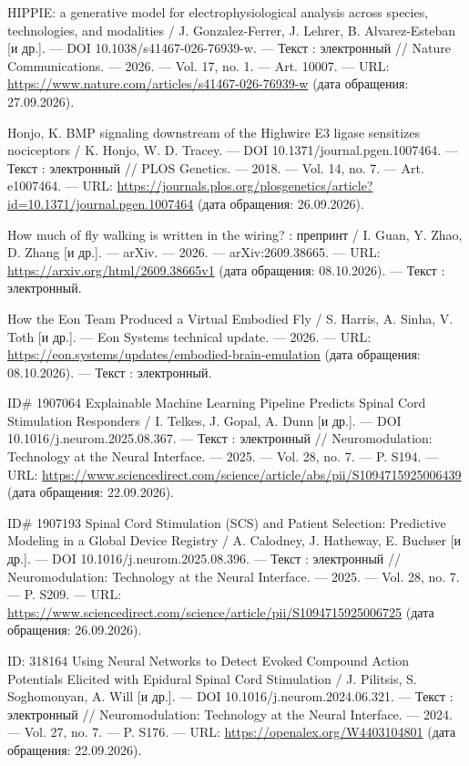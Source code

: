 \begin{list}{}{\setlength{\leftmargin}{10mm}\setlength{\labelwidth}{8mm}\setlength{\labelsep}{2mm}\setlength{\itemsep}{0pt}\setlength{\parsep}{0pt}\setlength{\topsep}{0pt}}
\item[150.] HIPPIE: a generative model for electrophysiological analysis across species, technologies, and modalities / J. Gonzalez-Ferrer, J. Lehrer, B. Alvarez-Esteban [и др.]. — DOI 10.1038/s41467-026-76939-w. — Текст : электронный // Nature Communications. — 2026. — Vol. 17, no. 1. — Art. 10007. — URL: \url{https://www.nature.com/articles/s41467-026-76939-w} (дата обращения: 27.09.2026).
\item[151.] Honjo, K. BMP signaling downstream of the Highwire E3 ligase sensitizes nociceptors / K. Honjo, W. D. Tracey. — DOI 10.1371/journal.pgen.1007464. — Текст : электронный // PLOS Genetics. — 2018. — Vol. 14, no. 7. — Art. e1007464. — URL: \url{https://journals.plos.org/plosgenetics/article?id=10.1371/journal.pgen.1007464} (дата обращения: 26.09.2026).
\item[152.] How much of fly walking is written in the wiring? : препринт / I. Guan, Y. Zhao, D. Zhang [и др.]. — arXiv. — 2026. — arXiv:2609.38665. — URL: \url{https://arxiv.org/html/2609.38665v1} (дата обращения: 08.10.2026). — Текст : электронный.
\item[153.] How the Eon Team Produced a Virtual Embodied Fly / S. Harris, A. Sinha, V. Toth [и др.]. — Eon Systems technical update. — 2026. — URL: \url{https://eon.systems/updates/embodied-brain-emulation} (дата обращения: 08.10.2026). — Текст : электронный.
\item[154.] ID\# 1907064 Explainable Machine Learning Pipeline Predicts Spinal Cord Stimulation Responders / I. Telkes, J. Gopal, A. Dunn [и др.]. — DOI 10.1016/j.neurom.2025.08.367. — Текст : электронный // Neuromodulation: Technology at the Neural Interface. — 2025. — Vol. 28, no. 7. — P. S194. — URL: \url{https://www.sciencedirect.com/science/article/abs/pii/S1094715925006439} (дата обращения: 22.09.2026).
\item[155.] ID\# 1907193 Spinal Cord Stimulation (SCS) and Patient Selection: Predictive Modeling in a Global Device Registry / A. Calodney, J. Hatheway, E. Buchser [и др.]. — DOI 10.1016/j.neurom.2025.08.396. — Текст : электронный // Neuromodulation: Technology at the Neural Interface. — 2025. — Vol. 28, no. 7. — P. S209. — URL: \url{https://www.sciencedirect.com/science/article/pii/S1094715925006725} (дата обращения: 26.09.2026).
\item[156.] ID: 318164 Using Neural Networks to Detect Evoked Compound Action Potentials Elicited with Epidural Spinal Cord Stimulation / J. Pilitsis, S. Soghomonyan, A. Will [и др.]. — DOI 10.1016/j.neurom.2024.06.321. — Текст : электронный // Neuromodulation: Technology at the Neural Interface. — 2024. — Vol. 27, no. 7. — P. S176. — URL: \url{https://openalex.org/W4403104801} (дата обращения: 22.09.2026).

\end{list}
